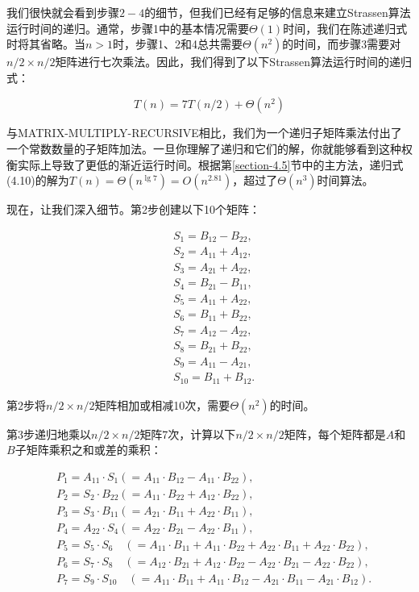 \documentclass[lang=cn,newtx,10pt,scheme=chinese]{elegantbook}
\begin{document}
我们很快就会看到步骤$2-4$的细节，但我们已经有足够的信息来建立Strassen算法运行时间的递归。通常，步骤1中的基本情况需要$\Theta(1)$时间，我们在陈述递归式时将其省略。当$n>1$时，步骤1、2和4总共需要$\Theta\left(n^2\right)$的时间，而步骤3需要对$n/2\times n/2$矩阵进行七次乘法。因此，我们得到了以下Strassen算法运行时间的递归式：

\begin{equation}
T(n)=7 T(n / 2)+\Theta(n^2)
\end{equation}

与MATRIX-MULTIPLY-RECURSIVE相比，我们为一个递归子矩阵乘法付出了一个常数数量的子矩阵加法。一旦你理解了递归和它们的解，你就能够看到这种权衡实际上导致了更低的渐近运行时间。根据第\ref{section-4.5}节中的主方法，递归式(4.10)的解为$T(n)=\Theta\left(n^{\lg 7}\right)=O\left(n^{2.81}\right)$，超过了$\Theta\left(n^3\right)$时间算法。

现在，让我们深入细节。第2步创建以下10个矩阵：

$$
\begin{aligned}
& S_1=B_{12}-B_{22}, \\
& S_2=A_{11}+A_{12}, \\
& S_3=A_{21}+A_{22}, \\
& S_4=B_{21}-B_{11}, \\
& S_5=A_{11}+A_{22}, \\
& S_6=B_{11}+B_{22}, \\
& S_7=A_{12}-A_{22}, \\
& S_8=B_{21}+B_{22}, \\
& S_9=A_{11}-A_{21}, \\
& S_{10}=B_{11}+B_{12} .
\end{aligned}
$$

第2步将$n/2\times n/2$矩阵相加或相减10次，需要$\Theta\left(n^2\right)$的时间。

第3步递归地乘以$n/2\times n/2$矩阵7次，计算以下$n/2\times n/2$矩阵，每个矩阵都是$A$和$B$子矩阵乘积之和或差的乘积：

$$
\begin{aligned}
& P_1=A_{11} \cdot S_1\left(=A_{11} \cdot B_{12}-A_{11} \cdot B_{22}\right), \\
& P_2=S_2 \cdot B_{22}\left(=A_{11} \cdot B_{22}+A_{12} \cdot B_{22}\right), \\
& P_3=S_3 \cdot B_{11}\left(=A_{21} \cdot B_{11}+A_{22} \cdot B_{11}\right), \\
& P_4=A_{22} \cdot S_4\left(=A_{22} \cdot B_{21}-A_{22} \cdot B_{11}\right), \\
& P_5=S_5 \cdot S_6 \quad\left(=A_{11} \cdot B_{11}+A_{11} \cdot B_{22}+A_{22} \cdot B_{11}+A_{22} \cdot B_{22}\right), \\
& P_6=S_7 \cdot S_8 \quad\left(=A_{12} \cdot B_{21}+A_{12} \cdot B_{22}-A_{22} \cdot B_{21}-A_{22} \cdot B_{22}\right), \\
& P_7=S_9 \cdot S_{10} \quad\left(=A_{11} \cdot B_{11}+A_{11} \cdot B_{12}-A_{21} \cdot B_{11}-A_{21} \cdot B_{12}\right) .
\end{aligned}
$$
\end{document}
